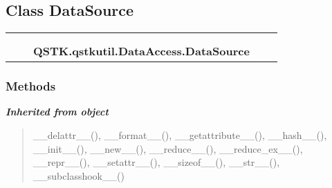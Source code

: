 

\subsection{Class DataSource}

    \label{QSTK:qstkutil:DataAccess:DataSource}
\begin{tabular}{cccccc}
\multicolumn{2}{r}{\settowidth{\BCL}{object}\multirow{2}{\BCL}{object}}
&&
  \\\cline{3-3}
  &&\multicolumn{1}{c|}{}
&&
  \\
&&\multicolumn{2}{l}{\textbf{QSTK.qstkutil.DataAccess.DataSource}}
\end{tabular}



  \subsubsection{Methods}


\large{\textbf{\textit{Inherited from object}}}

\begin{quote}
\_\_delattr\_\_(), \_\_format\_\_(), \_\_getattribute\_\_(), \_\_hash\_\_(), \_\_init\_\_(), \_\_new\_\_(), \_\_reduce\_\_(), \_\_reduce\_ex\_\_(), \_\_repr\_\_(), \_\_setattr\_\_(), \_\_sizeof\_\_(), \_\_str\_\_(), \_\_subclasshook\_\_()
\end{quote}


